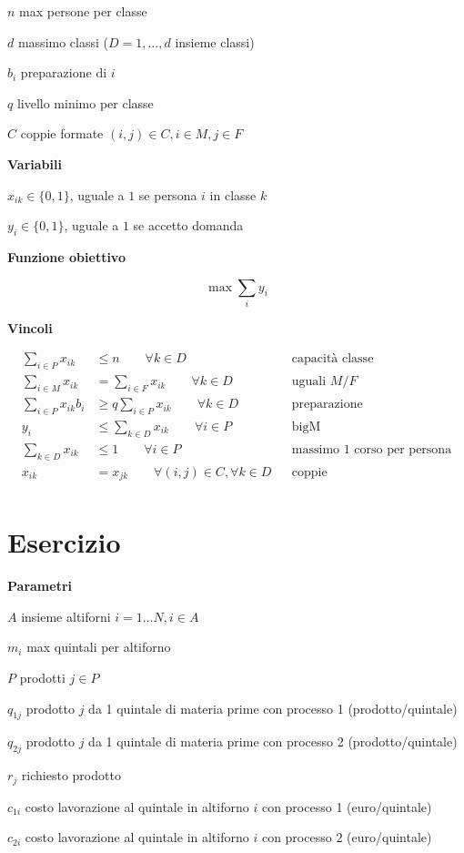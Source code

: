 \documentclass[10pt,a4paper,twoside,openright]{book}
\newcounter{es}
\newcommand{\Es}{
	\stepcounter{es}
	\section{Esercizio \arabic{es}}
	}
\newcommand{\Par}{\textbf{Parametri}}
\newcommand{\Var}{\textbf{Variabili}}
\newcommand{\Fob}{\textbf{Funzione obiettivo}}
\newcommand{\Vin}{\textbf{Vincoli}}
\begin{document}
$n$ max persone per classe

$d$ massimo classi ($D=1,\dotsc ,d$ insieme classi)

$b_{i}$ preparazione di $i$

$q$ livello minimo per classe

$C$ coppie formate $( i,j) \in C,i\in M,j\in F$

\Var

$x_{ik} \in \{0,1\}$, uguale a $1$ se persona $i$ in classe $k$

$y_{i} \in \{0,1\}$, uguale a $1$ se accetto domanda

\Fob

\begin{equation*}
	\max\sum _{i} y_{i}
\end{equation*}

\Vin

\begin{align*}
	\sum _{i\in P} x_{ik} &\leq n\qquad\forall k\in D && \text{capacità classe} \\
	\sum _{i\in M} x_{ik} &=\sum _{i\in F} x_{ik} \qquad\forall k\in D && \text{uguali $M/F$} \\
	\sum _{i\in P} x_{ik} b_{i} &\geq q\sum _{i\in P} x_{ik} \qquad\forall k\in D && \text{preparazione} \\
	y_{i} &\leq \sum _{k\in D} x_{ik} \qquad\forall i\in P && \text{bigM} \\
	\sum _{k\in D} x_{ik} &\leq 1\qquad\forall i\in P && \text{massimo $1$ corso per persona} \\
	x_{ik} &=x_{jk} \qquad\forall (i,j)\in C,\forall k\in D && \text{coppie} \\
\end{align*}

\Es

\Par

$A$ insieme altiforni $i=1\dotsc N,i\in A$

$m_{i}$ max quintali per altiforno

$P$ prodotti $j\in P$

$q_{1j}$ prodotto $j$ da 1 quintale di materia prime con processo 1 (prodotto/quintale)

$q_{2j}$ prodotto $j$ da 1 quintale di materia prime con processo 2 (prodotto/quintale)

$r_{j}$ richiesto prodotto

$c_{1i}$ costo lavorazione al quintale in altiforno $i$ con processo 1 (euro/quintale)

$c_{2i}$ costo lavorazione al quintale in altiforno $i$ con processo $2$ (euro/quintale)
\end{document}
